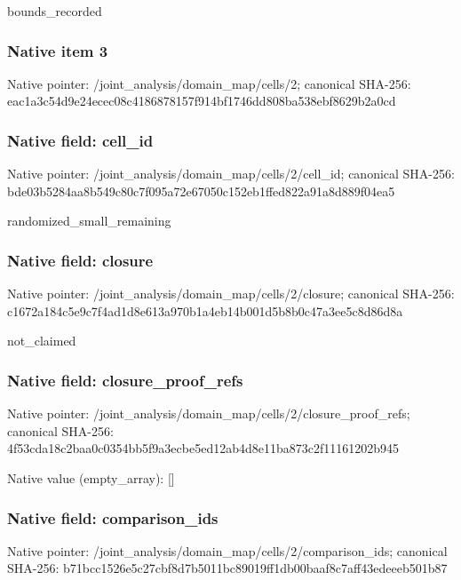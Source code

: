 \documentclass[10pt,a4paper]{article}
\begin{document}
\begingroup\raggedright\sloppy bounds\_\allowbreak{}recorded\par\endgroup

\subsubsection{Native item 3}
Native pointer: /joint\_\allowbreak{}analysis/domain\_\allowbreak{}map/cells/2; canonical SHA-256: eac1a3c54d9e24ecec08c4186878157f914bf1746dd808ba538ebf8629b2a0cd

\subsubsection{Native field: cell\_\allowbreak{}id}
Native pointer: /joint\_\allowbreak{}analysis/domain\_\allowbreak{}map/cells/2/cell\_\allowbreak{}id; canonical SHA-256: bde03b5284aa8b549c80c7f095a72e67050c152eb1ffed822a91a8d889f04ea5

\begingroup\raggedright\sloppy randomized\_\allowbreak{}small\_\allowbreak{}remaining\par\endgroup

\subsubsection{Native field: closure}
Native pointer: /joint\_\allowbreak{}analysis/domain\_\allowbreak{}map/cells/2/closure; canonical SHA-256: c1672a184c5e9c7f4ad1d8e613a970b1a4eb14b001d5b8b0c47a3ee5c8d86d8a

\begingroup\raggedright\sloppy not\_\allowbreak{}claimed\par\endgroup

\subsubsection{Native field: closure\_\allowbreak{}proof\_\allowbreak{}refs}
Native pointer: /joint\_\allowbreak{}analysis/domain\_\allowbreak{}map/cells/2/closure\_\allowbreak{}proof\_\allowbreak{}refs; canonical SHA-256: 4f53cda18c2baa0c0354bb5f9a3ecbe5ed12ab4d8e11ba873c2f11161202b945

Native value (empty\_\allowbreak{}array): []

\subsubsection{Native field: comparison\_\allowbreak{}ids}
Native pointer: /joint\_\allowbreak{}analysis/domain\_\allowbreak{}map/cells/2/comparison\_\allowbreak{}ids; canonical SHA-256: b71bcc1526e5c27cbf8d7b5011bc89019ff1db00baaf8c7aff43edeeeb501b87
\end{document}
